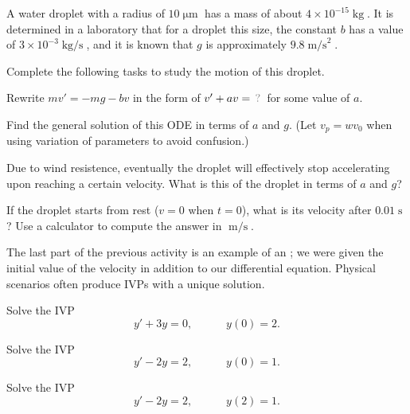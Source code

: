 \begin{applicationActivities}
\begin{activity}{20}
A water droplet with a radius of \(10\operatorname{\mu m}\) has a mass of about \(4 \times 10^{-15}\operatorname{kg}\).  
It is determined in a laboratory that for a droplet this size, the constant \(b\) has a value of \(3\times 10^{-3}\operatorname{kg/s}\),
and it is known that \(g\) is approximately \(9.8\operatorname{m/s}^2\).

\vfill

Complete the following tasks to study the motion of this droplet.
\begin{subactivity}
Rewrite \(mv'=-mg-bv\) in the form of \(v'+av=\unknown\) for some value of \(a\).
\end{subactivity}
\begin{subactivity}
Find the general solution of this ODE in terms of \(a\) and \(g\). 
(Let \(v_p=wv_0\) when using variation of parameters to avoid confusion.)
\end{subactivity}
\begin{subactivity}
Due to wind resistence, eventually the droplet will effectively stop accelerating upon reaching a certain velocity.
What is this  of the droplet in terms of \(a\) and \(g\)?
\end{subactivity}
\begin{subactivity}
If the droplet starts from rest (\(v=0\) when \(t=0\)), what is its velocity after \(0.01\operatorname{s}\)?
Use a calculator to compute the answer in \(\operatorname{m/s}\).
\end{subactivity}
\end{activity}

\begin{definition}
The last part of the previous activity is an example of an ; we were given the initial value of the velocity in addition to our differential equation.
\vfill
Physical scenarios often produce IVPs with a unique solution.
\end{definition}

\begin{activity}{10}
Solve the IVP
\[y'+3y=0,\hspace{3em} y(0)=2.\]
\end{activity}

\begin{activity}{10}
Solve the IVP
\[y'-2y=2, \hspace{3em} y(0)=1.\]
\end{activity}

\begin{activity}{5}
Solve the IVP
\[y'-2y=2, \hspace{3em} y(2)=1.\]
\end{activity}


\end{applicationActivities}
